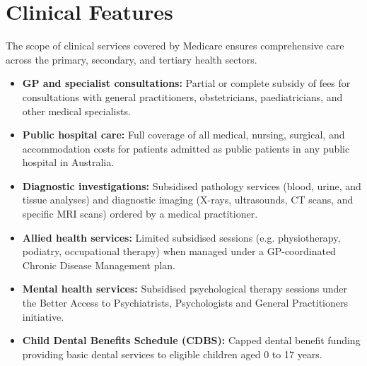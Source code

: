 \section*{Clinical Features}
The scope of clinical services covered by Medicare ensures comprehensive care across the primary, secondary, and tertiary health sectors.
\begin{itemize}
    \item \textbf{GP and specialist consultations:} Partial or complete subsidy of fees for consultations with general practitioners, obstetricians, paediatricians, and other medical specialists.
    \item \textbf{Public hospital care:} Full coverage of all medical, nursing, surgical, and accommodation costs for patients admitted as public patients in any public hospital in Australia.
    \item \textbf{Diagnostic investigations:} Subsidised pathology services (blood, urine, and tissue analyses) and diagnostic imaging (X-rays, ultrasounds, CT scans, and specific MRI scans) ordered by a medical practitioner.
    \item \textbf{Allied health services:} Limited subsidised sessions (e.g. physiotherapy, podiatry, occupational therapy) when managed under a GP-coordinated Chronic Disease Management plan.
    \item \textbf{Mental health services:} Subsidised psychological therapy sessions under the Better Access to Psychiatrists, Psychologists and General Practitioners initiative.
    \item \textbf{Child Dental Benefits Schedule (CDBS):} Capped dental benefit funding providing basic dental services to eligible children aged 0 to 17 years.
\end{itemize}

